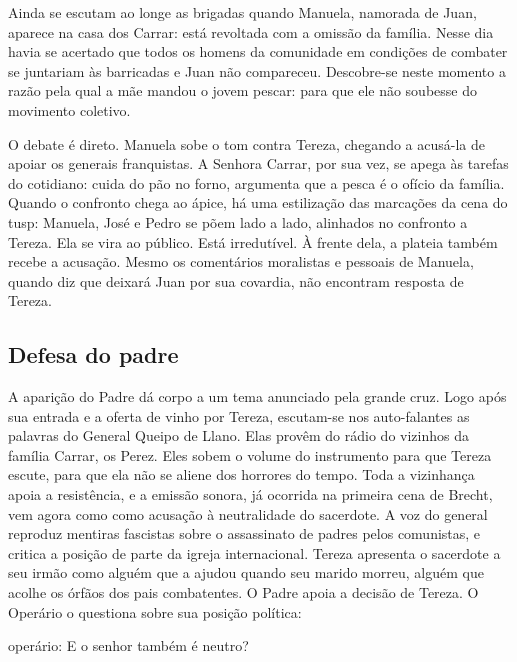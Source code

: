 Ainda se escutam ao longe as brigadas quando Manuela, namorada de Juan,
aparece na casa dos Carrar: está revoltada com a omissão da família.
Nesse dia havia se acertado que todos os homens da comunidade em
condições de combater se juntariam às barricadas e Juan não compareceu.
Descobre-se neste momento a razão pela qual a mãe mandou o jovem pescar:
para que ele não soubesse do movimento coletivo.

O debate é direto. Manuela sobe o tom contra Tereza, chegando a acusá-la
de apoiar os generais franquistas. A Senhora Carrar, por sua vez, se
apega às tarefas do cotidiano: cuida do pão no forno, argumenta que a
pesca é o ofício da família. Quando o confronto chega ao ápice, há uma
estilização das marcações da cena do {\sc tusp}: Manuela, José e Pedro se põem
lado a lado, alinhados no confronto a Tereza. Ela se vira ao público.
Está irredutível. À frente dela, a plateia também recebe a acusação.
Mesmo os comentários moralistas e pessoais de Manuela, quando diz que
deixará Juan por sua covardia, não encontram resposta de Tereza.


\subsection{Defesa do padre}

A aparição do Padre dá corpo a um tema anunciado pela grande cruz. Logo
após sua entrada e a oferta de vinho por Tereza, escutam-se nos
auto-falantes as palavras do General Queipo de Llano. Elas provêm do
rádio do vizinhos da família Carrar, os Perez. Eles sobem o volume do
instrumento para que Tereza escute, para que ela não se aliene dos
horrores do tempo. Toda a vizinhança apoia a resistência, e a emissão
sonora, já ocorrida na primeira cena de Brecht, vem agora como como
acusação à neutralidade do sacerdote. A voz do general reproduz mentiras
fascistas sobre o assassinato de padres pelos comunistas, e critica a
posição de parte da igreja internacional. Tereza apresenta o sacerdote a
seu irmão como alguém que a ajudou quando seu marido morreu, alguém que
acolhe os órfãos dos pais combatentes. O Padre apoia a decisão de
Tereza. O Operário o questiona sobre sua posição política:

{\sc operário}: E o senhor também é neutro?

